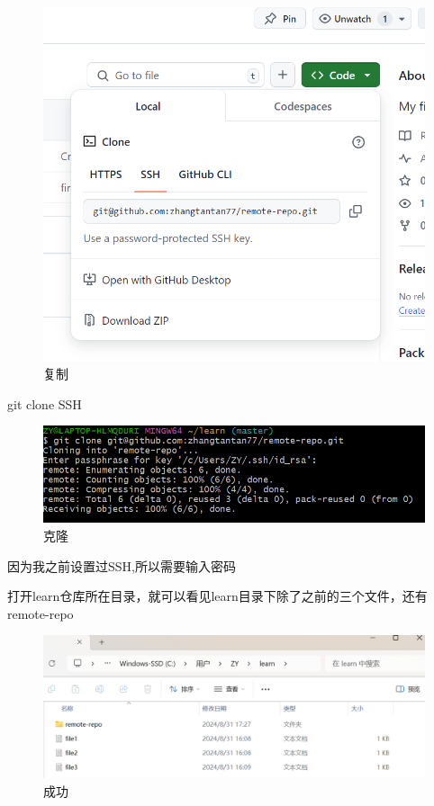 \documentclass{ctexart}
\begin{document}
	\begin{figure}[H]
		\centering
		\includegraphics{24}
		\caption{复制}
	\end{figure}
	git clone SSH
	\begin{figure}[H]
		\centering
		\includegraphics{25}
		\caption{克隆}
	\end{figure}
	
	因为我之前设置过SSH,所以需要输入密码
	
	打开learn仓库所在目录，就可以看见learn目录下除了之前的三个文件，还有remote-repo
	
	\begin{figure}[H]
		\centering
		\includegraphics{26}
		\caption{成功}
	\end{figure}
	
\end{document}
